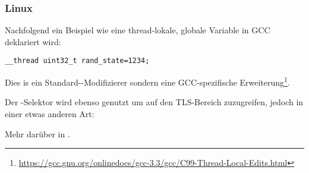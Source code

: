 \subsubsection{Linux}

Nachfolgend ein Beispiel wie eine thread-lokale, globale Variable in GCC deklariert wird:

\begin{lstlisting}
__thread uint32_t rand_state=1234;
\end{lstlisting}

Dies is ein Standard-\CCpp-Modifizierer sondern eine GCC-spezifische Erweiterung\footnote{\url{https://gcc.gnu.org/onlinedocs/gcc-3.3/gcc/C99-Thread-Local-Edits.html}}.


Der -Selektor wird ebenso genutzt um auf den \ac{TLS}-Bereich zuzugreifen,
jedoch in einer etwas anderen Art:




Mehr darüber in \DrepperTLS.
